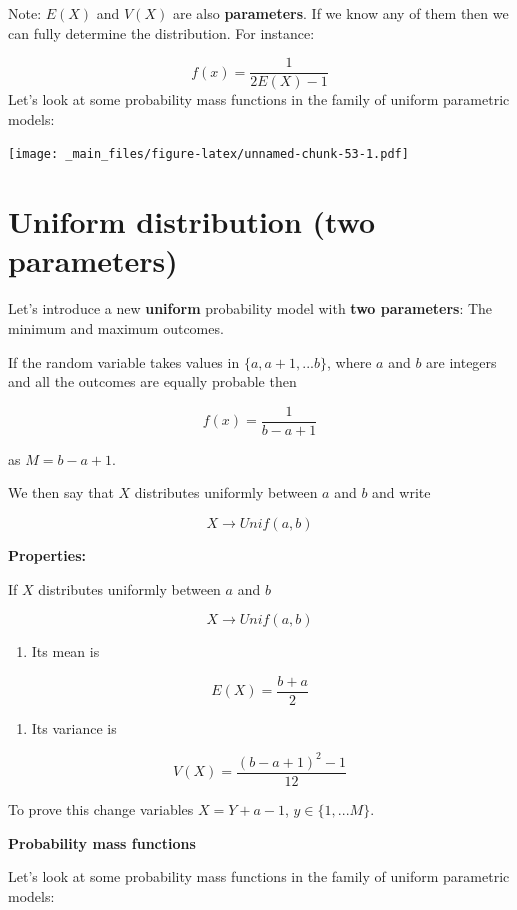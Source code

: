 \documentclass[
]{book}
\providecommand{\tightlist}{%
  \setlength{\itemsep}{0pt}\setlength{\parskip}{0pt}}
\begin{document}
Note: \(E(X)\) and \(V(X)\) are also \textbf{parameters}. If we know any of them then we can fully determine the distribution. For instance:

\[f(x)=\frac{1}{2E(X)-1}\]
Let's look at some probability mass functions in the family of uniform parametric models:

\texttt{[image: \_main\_files/figure-latex/unnamed-chunk-53-1.pdf]}

\hypertarget{uniform-distribution-two-parameters}{%
\section{Uniform distribution (two parameters)}\label{uniform-distribution-two-parameters}}

Let's introduce a new \textbf{uniform} probability model with \textbf{two parameters}: The minimum and maximum outcomes.

If the random variable takes values in \(\{a, a+1, ...b\}\), where \(a\) and \(b\) are integers and all the outcomes are equally probable then

\[f(x)=\frac{1}{b-a+1}\]

as \(M=b-a+1\).

We then say that \(X\) distributes uniformly between \(a\) and \(b\) and write

\[X \rightarrow Unif(a,b)\]

\textbf{Properties:}

If \(X\) distributes uniformly between \(a\) and \(b\)

\[X \rightarrow Unif(a,b)\]

\begin{enumerate}
\def\labelenumi{\arabic{enumi})}
\tightlist
\item
  Its mean is
\end{enumerate}

\[E(X)= \frac{b+a}{2}\]

\begin{enumerate}
\def\labelenumi{\arabic{enumi})}
\setcounter{enumi}{1}
\tightlist
\item
  Its variance is
\end{enumerate}

\[V(X)= \frac{(b-a+1)^2-1}{12}\]

To prove this change variables \(X=Y+a-1\), \(y \in \{1,...M\}\).

\textbf{Probability mass functions}

Let's look at some probability mass functions in the family of uniform parametric models:
\end{document}
